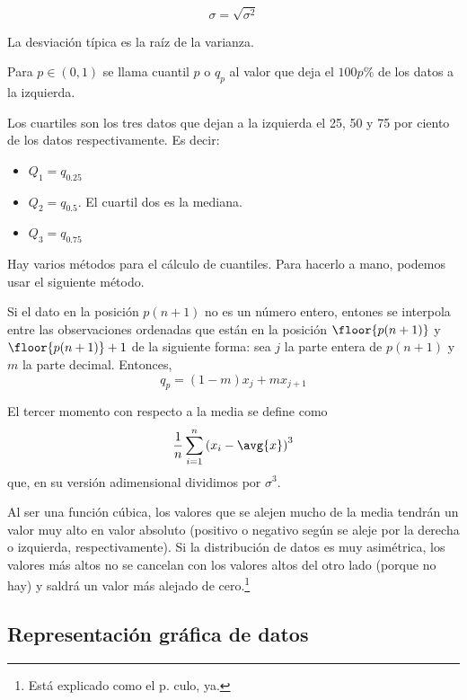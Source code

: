 \documentclass{apuntes}
\begin{document}
\begin{defn}
\[\sigma = \sqrt{\sigma^2} \]

La desviación típica es la raíz de la varianza.
\end{defn}

\begin{defn}[Cuantil]
Para $p\in (0, 1)$ se llama cuantil $p$ o $q_p$ al valor que deja el $100p \%$ de los datos a la izquierda.
\end{defn}

\begin{defn}[Cuartil]
Los cuartiles son los tres datos que dejan a la izquierda el 25, 50 y 75 por ciento de los datos respectivamente. Es decir:

\begin{itemize}
\item $Q_1 = q_{0.25}$
\item $Q_2 = q_{0.5}$. El cuartil dos es la mediana.
\item $Q_3 = q_{0.75}$
\end{itemize}
\end{defn}

Hay varios métodos para el cálculo de cuantiles. Para hacerlo a mano, podemos usar el siguiente método.

Si el dato en la posición $p(n+1)$ no es un número entero, entones se interpola entre las observaciones ordenadas que están en la posición $\floor{p(n+1)}$ y $\floor{p(n+1)} + 1$ de la siguiente forma: sea $j$ la parte entera de $p(n+1)$ y $m$ la parte decimal. Entonces, \[ q_p = (1-m)x_j + m x_{j+1} \]


\begin{defn}
El tercer momento con respecto a la media se define como \[ \frac{1}{n}\sum_{i=1}^n\left(x_i-\avg{x}\right)^3 \] que, en su versión adimensional dividimos por $\sigma^3$.
\end{defn}

Al ser una función cúbica, los valores que se alejen mucho de la media tendrán un valor muy alto en valor absoluto (positivo o negativo según se aleje por la derecha o izquierda, respectivamente). Si la distribución de datos es muy asimétrica, los valores más altos no se cancelan con los valores altos del otro lado (porque no hay) y saldrá un valor más alejado de cero.\footnote{Está explicado como el p. culo, ya.}

\subsection{Representación gráfica de datos}
\end{document}
